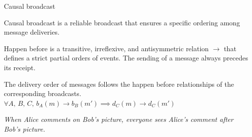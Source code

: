 \documentclass[10pt, xcolor={usenames, dvipsnames}]{beamer}
\begin{document}
\begin{frame}{Causal broadcast}

  Causal broadcast is a reliable broadcast that ensures a specific ordering
  among message deliveries. 
  
  \begin{definition}
    Happen before is a transitive, irreflexive, and antisymmetric relation
    $\rightarrow$ that defines a strict partial orders of events.  The sending
    of a message always precedes its receipt.
  \end{definition}

  \vspace{2em}

  \begin{definition}
    The delivery order of messages follows the happen before relationships of the
    corresponding broadcasts. $\forall A,\,B,\,C,\,
    b_A(m) \rightarrow b_B(m') \implies d_C(m) \rightarrow d_C(m')$
  \end{definition}

  \textit{When Alice comments on Bob's picture, everyone sees Alice's comment
    after Bob's picture.}

\end{frame}
\end{document}
